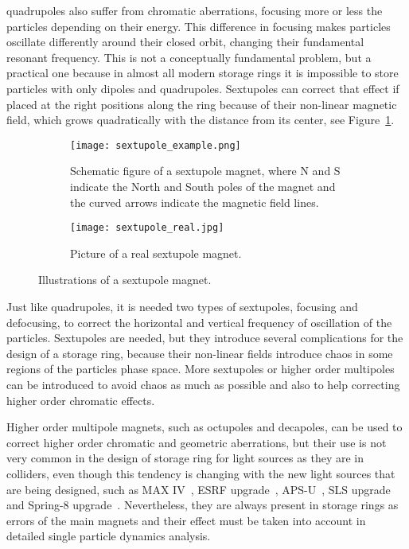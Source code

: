 \begin{description}[align=left]
        \item[Sextupoles:] quadrupoles also suffer from chromatic aberrations, focusing more or less the particles depending on their energy. This difference in focusing makes particles oscillate differently around their closed orbit, changing their fundamental resonant frequency. This is not a conceptually fundamental problem, but a practical one because in almost all modern storage rings it is impossible to store particles with only dipoles and quadrupoles. Sextupoles can correct that effect if placed at the right positions along the ring because of their non-linear magnetic field, which grows quadratically with the distance from its center, see Figure~\ref{fig:sextupole}.
        \begin{figure}
            \centering
            \begin{subfigure}[c]{0.47\textwidth}
                \centering
                \texttt{[image: sextupole\_example.png]}
                \caption{Schematic figure of a sextupole magnet, where N and S indicate the North and South poles of the magnet and the curved arrows indicate the magnetic field lines.}
            \end{subfigure}\hfill
            \begin{subfigure}[c]{0.5\textwidth}
                \texttt{[image: sextupole\_real.jpg]}
                \caption{Picture of a real sextupole magnet.}
            \end{subfigure}
            \caption{Illustrations of a sextupole magnet.}
            \label{fig:sextupole}
        \end{figure}
        Just like quadrupoles, it is needed two types of sextupoles, focusing and defocusing, to correct the horizontal and vertical frequency of oscillation of the particles. Sextupoles are needed, but they introduce several complications for the design of a storage ring, because their non-linear fields introduce chaos in some regions of the particles phase space. More sextupoles or higher order multipoles can be introduced to avoid chaos as much as possible and also to help correcting higher order chromatic effects.
    \end{description}

    Higher order multipole magnets, such as octupoles and decapoles, can be used to correct higher order chromatic and geometric aberrations, but their use is not very common in the design of storage ring for light sources as they are in colliders, even though this tendency is changing with the new light sources that are being designed, such as MAX IV~\cite{Leemann2009}, ESRF upgrade~\cite{Farvacque2013}, APS-U~\cite{Sun2013}, SLS upgrade~\cite{Soutome2016} and Spring-8 upgrade~\cite{Soutome2016}. Nevertheless, they are always present in storage rings as errors of the main magnets and their effect must be taken into account in detailed single particle dynamics analysis.

